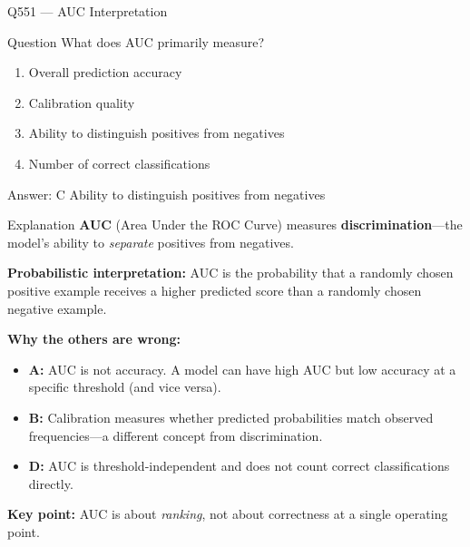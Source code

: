\documentclass[aspectratio=169,8pt]{beamer}
\begin{document}
	\begin{frame}{Q551 --- AUC Interpretation}
		\begin{block}{Question}
			What does AUC primarily measure?
			\begin{enumerate}
				\item Overall prediction accuracy
				\item Calibration quality
				\item Ability to distinguish positives from negatives
				\item Number of correct classifications
			\end{enumerate}
		\end{block}
		
		\begin{exampleblock}{Answer: C}
			Ability to distinguish positives from negatives
		\end{exampleblock}
		
		\begin{block}{Explanation}
			\textbf{AUC} (Area Under the ROC Curve) measures \textbf{discrimination}---the
			model's ability to \emph{separate} positives from negatives.
			
			\textbf{Probabilistic interpretation:} AUC is the probability that a randomly
			chosen positive example receives a higher predicted score than a randomly
			chosen negative example.
			
			\textbf{Why the others are wrong:}
			\begin{itemize}
				\item \textbf{A:} AUC is not accuracy. A model can have high AUC but low
				accuracy at a specific threshold (and vice versa).
				\item \textbf{B:} Calibration measures whether predicted probabilities match
				observed frequencies---a different concept from discrimination.
				\item \textbf{D:} AUC is threshold-independent and does not count correct
				classifications directly.
			\end{itemize}
			
			\textbf{Key point:} AUC is about \emph{ranking}, not about correctness at a
			single operating point.
		\end{block}
	\end{frame}
	
\end{document}
